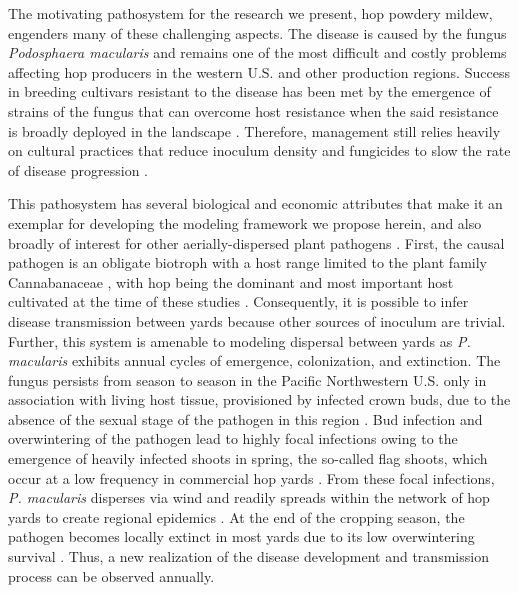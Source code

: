\documentclass[10pt,a4paper]{article}
\begin{document}
The motivating pathosystem for the research we present, hop powdery mildew, engenders many of these challenging aspects. The disease is caused by the fungus \textit{Podosphaera macularis} and remains one of the most difficult and costly problems affecting hop producers in the western U.S. and other production regions. Success in breeding cultivars resistant to the disease has been met by the emergence of strains of the fungus that can overcome host resistance when the said resistance is broadly deployed in the landscape  \parencite{Block2021, Gent2017, Royle1978, Wolfenbarger2016}. Therefore, management still relies heavily on cultural practices that reduce inoculum density and fungicides to slow the rate of disease progression \parencite{Gent2019b, Mahaffee2009, Nelson2015, Probst2016, Royle1978}.

This pathosystem has several biological and economic attributes that make it an exemplar for developing the modeling framework we propose herein, and also broadly of interest for other aerially-dispersed plant pathogens . First, the causal pathogen is an obligate biotroph with a host range limited to the plant family Cannabanaceae \parencite{Mahaffee2009},  with hop being the dominant and most important host cultivated at the time of these studies \parencite{Rivedal2023}.  Consequently, it is possible to infer disease transmission between yards because other sources of inoculum are trivial. Further, this system is amenable to modeling dispersal between yards as \textit{P. macularis} exhibits annual cycles of emergence, colonization, and extinction. The fungus persists from season to season in the Pacific Northwestern U.S. only in association with living host tissue, provisioned by infected crown buds, due to the absence of the sexual stage of the pathogen in this region \parencite{Gent2008, Weldon2021, Wolfenbarger2015}.  Bud infection and overwintering of the pathogen lead to highly focal infections owing to the emergence of heavily infected shoots in spring, the so-called flag shoots, which occur at a low frequency in commercial hop yards \parencite{Gent2019b,Laurie2023}. From these focal infections, \textit{P. macularis} disperses via wind and readily spreads within the network of hop yards to create regional epidemics \parencite{Gent2019a}. At the end of the cropping season, the pathogen becomes locally extinct in most yards due to its low overwintering survival \parencite{Gent2019b, Gent2018}. Thus, a new realization of the disease development and transmission process can be observed annually.
\end{document}
